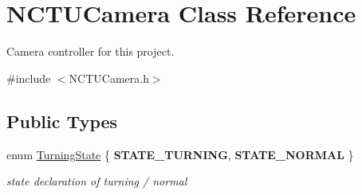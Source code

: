 \hypertarget{class_n_c_t_u_camera}{}\section{N\+C\+T\+U\+Camera Class Reference}
\label{class_n_c_t_u_camera}


Camera controller for this project.  




{\ttfamily \#include $<$N\+C\+T\+U\+Camera.\+h$>$}

\subsection*{Public Types}
\begin{DoxyCompactItemize}
\item 
enum \hyperlink{class_n_c_t_u_camera_a375160f41c982180edf9a658e316ef58}{Turning\+State} \{ {\bfseries S\+T\+A\+T\+E\+\_\+\+T\+U\+R\+N\+I\+NG}, 
{\bfseries S\+T\+A\+T\+E\+\_\+\+N\+O\+R\+M\+AL}
 \}\hypertarget{class_n_c_t_u_camera_a375160f41c982180edf9a658e316ef58}{}\label{class_n_c_t_u_camera_a375160f41c982180edf9a658e316ef58}
\begin{DoxyCompactList}\small\item\em state declaration of turning / normal \end{DoxyCompactList}
\end{DoxyCompactItemize}
